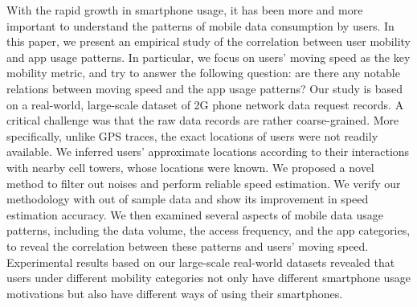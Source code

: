 With the rapid growth in smartphone usage, it has been more and more important to understand the patterns of mobile data consumption by users.
In this paper, we present an empirical study 
of the correlation between user mobility and app usage patterns.
In particular, we focus on users' moving speed as the key mobility metric,
and try to answer the following question:
are there any notable relations between moving speed and the app usage patterns?
Our study is based on a real-world, large-scale dataset of 2G phone network data request records.
A critical challenge was that the raw data records are rather coarse-grained.
More specifically, unlike GPS traces, the exact locations of users were not readily available.
We inferred users' approximate locations according to their interactions with nearby cell towers, whose locations were known.
We %
proposed a novel method to filter out noises and perform reliable speed estimation.
We verify our methodology with out of sample data and show its improvement in speed estimation accuracy.
We then examined several aspects of mobile data usage patterns,
including the data volume, the access frequency, and the app categories,
to reveal the correlation between these patterns and users' moving speed.
Experimental results based on our large-scale real-world datasets revealed that users under different mobility categories not only have different smartphone usage motivations but also have different ways of using their smartphones.